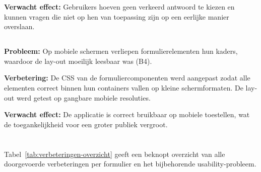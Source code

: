 \textbf{Verwacht effect:} Gebruikers hoeven geen verkeerd antwoord te kiezen en kunnen vragen die niet op hen van toepassing zijn op een eerlijke manier overslaan.

\subsection{}

\textbf{Probleem:} Op mobiele schermen verliepen formulierelementen hun kaders, waardoor de lay-out moeilijk leesbaar was (B4).

\textbf{Verbetering:} De CSS van de formuliercomponenten werd aangepast zodat alle elementen correct binnen hun containers vallen op kleine schermformaten. De lay-out werd getest op gangbare mobiele resoluties.

\textbf{Verwacht effect:} De applicatie is correct bruikbaar op mobiele toestellen, wat de toegankelijkheid voor een groter publiek vergroot.

\section{}

Tabel~\ref{tab:verbeteringen-overzicht} geeft een beknopt overzicht van alle doorgevoerde verbeteringen per formulier en het bijbehorende usability-probleem.

